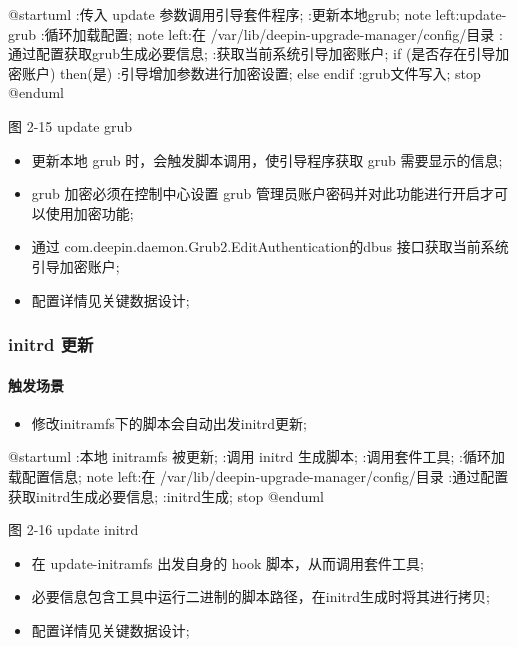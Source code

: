 \documentclass{utart}
\begin{document}
\begin{center}
  \begin{adjustbox}{scale=0.75}
    \begin{plantuml}
      @startuml
      :传入 update 参数调用引导套件程序;
      :更新本地grub;
      note left:update-grub
      :循环加载配置;
      note left:在 /var/lib/deepin-upgrade-manager/config/目录
      :通过配置获取grub生成必要信息;
      :获取当前系统引导加密账户;
      if (是否存在引导加密账户) then(是)
      :引导增加参数进行加密设置;
      else
      endif
      :grub文件写入;
      stop
      @enduml
    \end{plantuml}
  \end{adjustbox}

  图 2-15 update grub
\end{center}
\begin{itemize}[leftmargin=4em]
  \item 更新本地 grub 时，会触发脚本调用，使引导程序获取 grub 需要显示的信息;
  \item grub 加密必须在控制中心设置 grub 管理员账户密码并对此功能进行开启才可以使用加密功能;
  \item 通过 com.deepin.daemon.Grub2.EditAuthentication的dbus 接口获取当前系统引导加密账户;
  \item 配置详情见关键数据设计;
\end{itemize}

\subsubsection{initrd 更新}
\paragraph{触发场景}
\begin{itemize}[leftmargin=4em]
  \item 修改initramfs下的脚本会自动出发initrd更新;
\end{itemize}

\begin{center}
  \begin{adjustbox}{scale=0.75}
    \begin{plantuml}
      @startuml
      :本地 initramfs 被更新;
      :调用 initrd 生成脚本;
      :调用套件工具;
      :循环加载配置信息;
      note left:在 /var/lib/deepin-upgrade-manager/config/目录
      :通过配置获取initrd生成必要信息;
      :initrd生成;
      stop
      @enduml
    \end{plantuml}
  \end{adjustbox}

  图 2-16 update initrd
\end{center}
\begin{itemize}[leftmargin=4em]
  \item 在 update-initramfs 出发自身的 hook 脚本，从而调用套件工具;
  \item 必要信息包含工具中运行二进制的脚本路径，在initrd生成时将其进行拷贝;
  \item 配置详情见关键数据设计;
\end{itemize}
\end{document}
